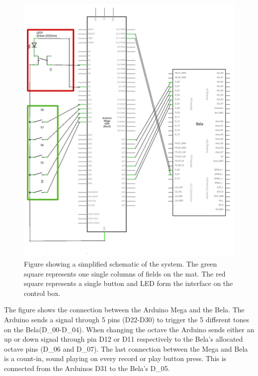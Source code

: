 	\begin{figure}[H]
	\centering
	\includegraphics[width=1\linewidth]{figure/Implementation/project_schem_marked.png}
	\caption{Figure showing a simplified schematic of the system. The green square represents one single columns of fields on the mat. The red square represents a single button and LED form the interface on the control box.}
	\label{fig:schematic}
\end{figure}

The figure shows the connection between the Arduino Mega and the Bela. The Arduino sends a signal through 5 pins (D22-D30) to trigger the 5 different tones on the Bela(D\_00-D\_04). When changing the octave the Arduino sends either an up or down signal through pin D12 or D11 respectively to the Bela's allocated octave pins (D\_06 and D\_07). The last connection between the Mega and Bela is a count-in, sound playing on every record or play button press. This is connected from the Arduinos D31 to the Bela's D\_05.